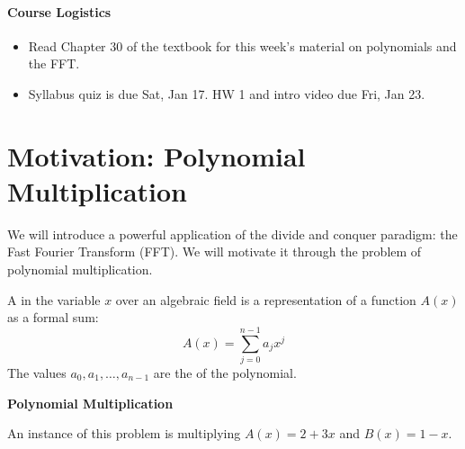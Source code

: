 \documentclass[11  pt]{article}
\begin{document}
\onehalfspacing


\paragraph{Course Logistics}

\begin{itemize}
\item Read Chapter 30 of the textbook for this week's material on polynomials and the FFT.
\item Syllabus quiz is due Sat, Jan 17. HW 1 and intro video due Fri, Jan 23.
\end{itemize}

\section{Motivation: Polynomial Multiplication}

We will introduce a powerful application of the divide and conquer paradigm: the Fast Fourier Transform (FFT). We will motivate it through the problem of polynomial multiplication.

\begin{definition} \noindent A  in the variable $x$ over an algebraic field is a representation of a function $A(x)$ as a formal sum:
    \begin{equation*}
        A(x) = \sum_{j=0}^{n-1} a_j x^j
    \end{equation*}
    The values $a_0, a_1, \hdots, a_{n-1}$ are the  of the polynomial. 
\end{definition}

\vs{.5cm}

\begin{example}\textbf{Polynomial Multiplication} \\

\vs{5pt}

An instance of this problem is multiplying $A(x) = 2 + 3x$ and $B(x) = 1 - x$.
\end{example}
\end{document}
